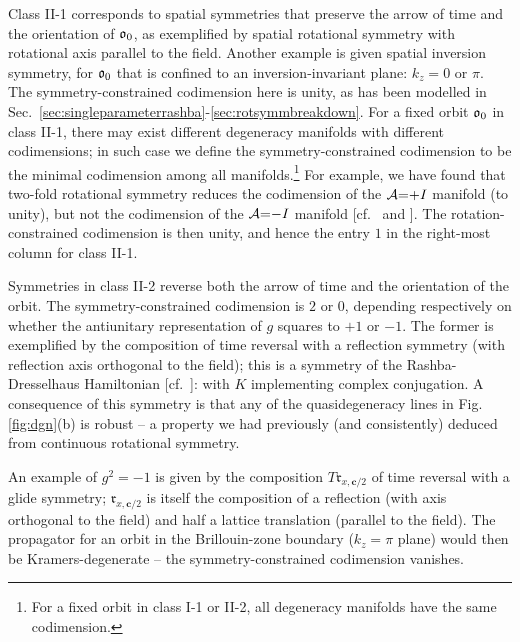 \documentclass[aps, showpacs, twocolumn, notitlepage, superscriptaddress]{revtex4-1}
\begin{document}
Class II-1 corresponds to spatial symmetries that preserve the arrow of time and the orientation of $\mathfrak{o}_0$, as exemplified by spatial rotational symmetry with rotational axis parallel to the field. Another example is given spatial inversion symmetry, for $\mathfrak{o}_0$ that is confined to an inversion-invariant plane: $k_z=0$ or $\pi$. The symmetry-constrained codimension here is unity, as has been modelled in Sec.\ \ref{sec:singleparameterrashba}-\ref{sec:rotsymmbreakdown}. For a fixed orbit $\mathfrak{o}_0$ in class II-1, there may exist different degeneracy manifolds with different codimensions; in such case we define the symmetry-constrained codimension to be the minimal codimension among all manifolds.\footnote{For a fixed orbit in class I-1 or II-2, all degeneracy manifolds have the same codimension.} For example, we have found that two-fold rotational symmetry reduces the codimension of the ${\cal A}{=}{+}I$ manifold (to unity), but not the codimension of the ${\cal A}{=}{-}I$ manifold [cf.\  and ]. The rotation-constrained codimension is then unity, and hence the entry $1$ in the right-most column for class II-1.

Symmetries in class II-2 reverse both the arrow of time and the orientation of the orbit. The symmetry-constrained codimension is $2$ or $0$, depending respectively on whether the antiunitary representation of $g$ squares to $+1$ or $-1$. The former is exemplified by the composition of time reversal with a reflection symmetry (with reflection axis orthogonal to the field); this is a symmetry of the Rashba-Dresselhaus Hamiltonian [cf.\ ]:
with $K$ implementing complex conjugation. A consequence of this symmetry is that any of the quasidegeneracy lines in Fig. \ref{fig:dgn}(b) is robust -- a property we had previously (and consistently) deduced from continuous rotational symmetry. 

An example of $g^2{=}-1$ is given by
the composition $T\mathfrak{r}_{x,\boldsymbol{c}/2}$ of time reversal with a glide symmetry; $\mathfrak{r}_{x,\boldsymbol{c}/2}$ is itself the composition of a reflection (with axis orthogonal to the field) and half a lattice translation (parallel to the field). The propagator for an orbit in the Brillouin-zone boundary ($k_z{=}\pi$ plane) would then be Kramers-degenerate -- the symmetry-constrained codimension vanishes.
\end{document}
